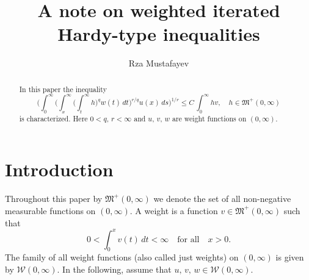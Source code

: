 \documentclass[12pt]{amsart}
\theoremstyle{plain}
\theoremstyle{definition}
\numberwithin{thm}{section}
\numberwithin{equation}{section}
\begin{document}
\title{A note on weighted iterated Hardy-type inequalities}

\author[R.Ch. Mustafayev]{Rza Mustafayev}
\address{Department of Mathematics \\ Faculty of Science and Arts \\ Kirikkale
	University \\ 71450 Yahsihan, Kirikkale, Turkey}



\begin{abstract}
In this paper the inequality
$$
\bigg( \int_0^{\infty} \bigg( \int_x^{\infty} \bigg( \int_t^{\infty} h \bigg)^q w(t)\,dt
\bigg)^{r / q} u(x)\,ds \bigg)^{1/r}\leq C \,\int_0^{\infty} h v, \quad h \in {\mathfrak M}^+(0,\infty)
$$
is characterized. Here $0 < q ,\, r < \infty$ and $u,\,v,\,w$ are weight functions on $(0,\infty)$.
\end{abstract}

\maketitle

\section{Introduction}\label{in}

Throughout this paper by ${\mathfrak M}^+ (0,\infty)$ we denote the set of all non-negative measurable functions on $(0,\infty)$.
A weight is a function $v \in {\mathfrak M}^+ (0,\infty)$ such that
$$
0 < \int_0^x v(t)\,dt < \infty \quad \mbox{for all} \quad x > 0.
$$
The family of all weight functions (also called just weights) on $(0,\infty)$ is given by ${\mathcal W}{(0,\infty)}$. In the following, assume that $u,\,v,\,w \in {\mathcal W}{(0,\infty)}$.
\end{document}
